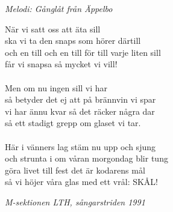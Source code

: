 {\footnotesize\textit{Melodi: Gånglåt från Äppelbo}}\par
\vspace{10pt}
När vi satt oss att äta sill\\
ska vi ta den snaps som hörer därtill\\
och en till och en till för till varje liten sill\\
får vi snapsa så mycket vi vill!\\
\\
Men om nu ingen sill vi har\\
så betyder det ej att på brännvin vi spar\\
vi har ännu kvar så det räcker några dar\\
så ett stadigt grepp om glaset vi tar.\\
\\
Här i vänners lag stäm nu upp och sjung\\
och strunta i om våran morgondag blir tung\\
göra livet till fest det är kodarens mål\\
så vi höjer våra glas med ett vrål: SKÅL!
\par
\vspace{10pt}
{\footnotesize\textit{M-sektionen LTH, sångarstriden 1991}}
